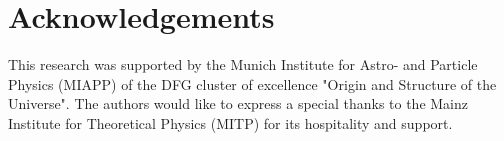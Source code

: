 \chapter{Acknowledgements}

This research was supported by the Munich Institute for Astro- and Particle Physics (MIAPP) of the DFG cluster of excellence "Origin and Structure of the Universe".
The authors would like to express a special thanks to the Mainz Institute for Theoretical Physics (MITP) for its hospitality and support. 

